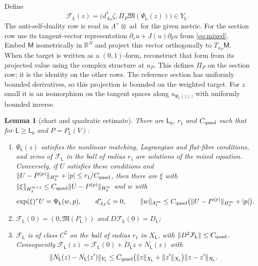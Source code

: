 \documentclass[11pt]{amsart}
\newtheorem{lemma}[theorem]{Lemma}
\theoremstyle{definition}
\theoremstyle{remark}
\theoremstyle{plain}
\numberwithin{equation}{section}
\newcommand{\ad}{\operatorname{ad}}
\newcommand{\Msf}{\mathsf{M}}
\begin{document}
Define
\[
 \mathcal F_\mathsf L(z)=
 \bigl(d_{A_P}^*\zeta,
                   \Pi_P\mathfrak M(\Psi_\mathsf L(z))\bigr)
 \in Y_\mathsf L.
\]
The anti-self-duality row is read in $\Lambda^+\otimes\ad$ for
the given metric. For the section row use its tangent-vector
representation $\partial_su+J(u)\partial_\theta u$ from
\eqref{eq:mixed}. Embed $\Msf$ isometrically in $\mathbb R^N$
and project this vector orthogonally to $T_{u_P}\Msf$.
When the target is written as a $(0,1)$-form, reconstruct that
form from its projected value using the complex structure at
$u_P$. This defines $\Pi_P$ on the section row; it is the identity
on the other rows. The reference
section has uniformly bounded derivatives, so this projection is
bounded on the weighted target. For $z$ small it is an isomorphism
on the tangent spaces along $u_{\Psi_\mathsf L(z)}$, with uniformly
bounded inverse.

\begin{lemma}[chart and quadratic estimate]\label{lem:torus-quadratic}
There are $\mathsf L_0$, $r_1$ and $C_{\rm quad}$ such that for $\mathsf L\ge \mathsf L_0$ and $P=P_{\mathsf L}(V)$:
\begin{enumerate}[label=(\alph*)]
\item $\Psi_{\mathsf L}(z)$ satisfies the nonlinear matching, Lagrangian and flat-fibre
  conditions, and zeros of $\mathcal F_\mathsf L$ in the ball of radius $r_1$ are solutions of the mixed
  equation.
  Conversely, if $U$ satisfies these conditions and $\|U-P^{(p)}\|_{H^m_\delta}+|p|\le r_1/C_{\rm quad}$,
  then there are $\xi$ with $\|\xi\|_{H^{m+1}_\delta}\le C_{\rm quad}\|U-P^{(p)}\|_{H^m_\delta}$ and $w$ with
  \[
  \exp(\xi)^*U=\Psi_{\mathsf L}(w,p),\qquad d^*_{A_P}\zeta=0,\qquad\|w\|_{\mathcal X^m_\mathsf L}\le C_{\rm quad}\bigl(\|U-P^{(p)}\|_{H^m_\delta}+|p|\bigr).
  \]
\item $\mathcal F_{\mathsf L}(0)=(0,\mathfrak M(P_\mathsf L))$ and $D\mathcal F_{\mathsf L}(0)=D_\mathsf L$;
\item $\mathcal F_\mathsf L$ is of class $C^2$ on the ball of radius $r_1$ in $X_\mathsf L$, with
  $\|D^2\mathcal F_\mathsf L\|\le C_{\rm quad}$. Consequently $\mathcal F_{\mathsf L}(z)=\mathcal F_{\mathsf L}(0)+D_{\mathsf L}z+N_{\mathsf L}(z)$ with
  \[
  \|N_{\mathsf L}(z)-N_{\mathsf L}(z')\|_{Y_\mathsf L}\le C_{\rm quad}\bigl(\|z\|_{X_\mathsf L}+\|z'\|_{X_\mathsf L}\bigr)\|z-z'\|_{X_\mathsf L}.
  \]
\end{enumerate}
\end{lemma}
\end{document}
